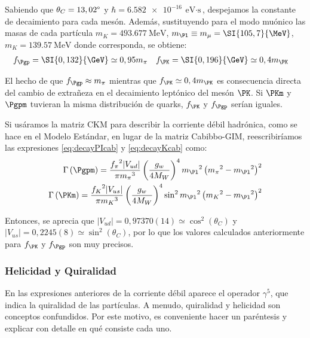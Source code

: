 Sabiendo que $\theta_{C}=13,02\degree$ y $\hbar=\SI{6,582e-16}{\eV\cdot\second}$, despejamos la constante de decaimiento para cada mesón. Además, sustituyendo para el modo muónico las masas de cada partícula $m_{K}=\SI{493,677}{\MeV}$, $m_{\Pl} \equiv m_{\mu}=\SI{105,7}{\MeV}$, $m_{K}=\SI{139,57}{\MeV}$ donde corresponda, se obtiene:
\begin{align}
f_{\Pgp} &= \SI{0,132}{\GeV} \simeq 0,95m_{\pi} & f_{\PK} &= \SI{0,196}{\GeV} \simeq 0,4m_{\PK}
\end{align}

El hecho de que $f_{\Pgp} \approx m_{\pi}$ mientras que $f_{\PK} \simeq 0,4m_{\PK}$  es consecuencia directa del cambio de extrañeza en el decaimiento leptónico del mesón $\PK$. Si $\PKm$ y $\Pgpm$ tuvieran la misma distribución de quarks, $f_{\PK}$ y $f_{\Pgp}$ serían iguales.

Si usáramos la matriz CKM para describir la corriente débil hadrónica, como se hace en el Modelo Estándar, en lugar de la matriz Cabibbo-GIM, reescribiríamos las expresiones \ref{eq:decayPIcab} y \ref{eq:decayKcab} como:
\begin{align}
\Gamma\left(\Pgpm \right) =\dfrac{{f_{\pi}}^{2}|V_{ud}|}{\pi {m_{\pi}}^{3}}\left( \dfrac{g_w}{4M_W}\right)^{4} {m_{\Pl}}^{2}\left({m_{\pi}}^{2}-{m_{\Pl}}^{2}\right)^{2}\label{eq:decayPIckm}\\
\Gamma\left(\PKm \right) =\dfrac{{f_{K}}^{2}|V_{us}|}{\pi {m_{K}}^{3}}\left(\dfrac{g_w}{4M_W}\right)^{4} \sin^{2} {m_{\Pl}}^{2}\left({m_{K}}^{2}-{m_{\Pl}}^{2}\right)^{2}\label{eq:decayKckm}
\end{align}

Entonces, se aprecia que $|V_{ud}|= 0,97370(14) \simeq \cos^{2} \left(\theta_{C}\right)$ y $|V_{us}|= 0,2245(8) \simeq \sin^{2} \left(\theta_{C}\right)$, por lo que los valores calculados anteriormente para $f_{\PK}$ y $f_{\Pgp}$ son muy precisos\protect\footnotemark .


\subsubsection{Helicidad y Quiralidad}\label{sec:quirality}
En las expresiones anteriores de la corriente débil aparece el operador $\gamma^5$, que indica la quiralidad de las partículas. A menudo, quiralidad y helicidad son conceptos confundidos. Por este motivo, es conveniente hacer un paréntesis y explicar con detalle en qué consiste cada uno.

